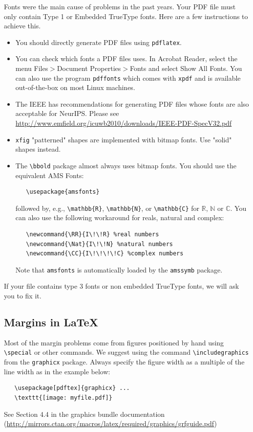 \documentclass{article}
\begin{document}
Fonts were the main cause of problems in the past years. Your PDF file must only
contain Type 1 or Embedded TrueType fonts. Here are a few instructions to
achieve this.

\begin{itemize}

\item You should directly generate PDF files using \verb+pdflatex+.

\item You can check which fonts a PDF files uses.  In Acrobat Reader, select the
  menu Files$>$Document Properties$>$Fonts and select Show All Fonts. You can
  also use the program \verb+pdffonts+ which comes with \verb+xpdf+ and is
  available out-of-the-box on most Linux machines.

\item The IEEE has recommendations for generating PDF files whose fonts are also
  acceptable for NeurIPS. Please see
  \url{http://www.emfield.org/icuwb2010/downloads/IEEE-PDF-SpecV32.pdf}

\item \verb+xfig+ "patterned" shapes are implemented with bitmap fonts.  Use
  "solid" shapes instead.

\item The \verb+\bbold+ package almost always uses bitmap fonts.  You should use
  the equivalent AMS Fonts:
\begin{verbatim}
   \usepackage{amsfonts}
\end{verbatim}
followed by, e.g., \verb+\mathbb{R}+, \verb+\mathbb{N}+, or \verb+\mathbb{C}+
for $\mathbb{R}$, $\mathbb{N}$ or $\mathbb{C}$.  You can also use the following
workaround for reals, natural and complex:
\begin{verbatim}
   \newcommand{\RR}{I\!\!R} %real numbers
   \newcommand{\Nat}{I\!\!N} %natural numbers
   \newcommand{\CC}{I\!\!\!\!C} %complex numbers
\end{verbatim}
Note that \verb+amsfonts+ is automatically loaded by the \verb+amssymb+ package.

\end{itemize}

If your file contains type 3 fonts or non embedded TrueType fonts, we will ask
you to fix it.

\subsection{Margins in \LaTeX{}}

Most of the margin problems come from figures positioned by hand using
\verb+\special+ or other commands. We suggest using the command
\verb+\includegraphics+ from the \verb+graphicx+ package. Always specify the
figure width as a multiple of the line width as in the example below:
\begin{verbatim}
   \usepackage[pdftex]{graphicx} ...
   \texttt{[image: myfile.pdf]}
\end{verbatim}
See Section 4.4 in the graphics bundle documentation
(\url{http://mirrors.ctan.org/macros/latex/required/graphics/grfguide.pdf})
\end{document}
